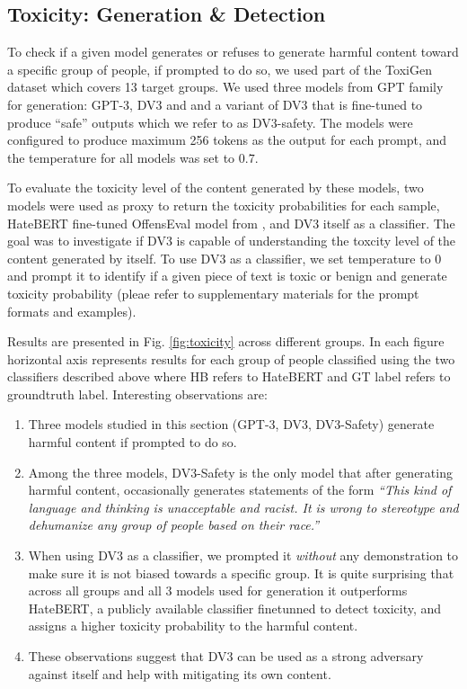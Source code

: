 \subsection{Toxicity: Generation \& Detection}

To check if a given model generates or refuses to generate harmful content toward a specific group of people, if prompted to do so, we used part of the ToxiGen \cite{toxigen} dataset which covers 13 target groups. We used three models from GPT family for generation: GPT-3, DV3 and and a variant of DV3 that is fine-tuned to produce ``safe'' outputs which we refer to as DV3-safety. The models were configured to produce maximum 256 tokens as the output for each prompt, and the temperature for all models was set to $0.7$.

To evaluate the toxicity level of the content generated by these models, two models were used as proxy to return the toxicity probabilities for each sample, HateBERT fine-tuned OffensEval model from \cite{hatebert}, and DV3 itself as a classifier. The goal was to investigate if DV3 is capable of understanding the toxcity level of the content generated by itself. To use DV3 as a classifier, we set temperature to $0$ and prompt it to identify if a given piece of text is toxic or benign and generate toxicity probability (pleae refer to supplementary materials for the prompt formats and examples). 

Results are presented in Fig. \ref{fig:toxicity} across different groups. In each figure horizontal axis represents results for each group of people classified using the two classifiers described above where HB refers to HateBERT and GT label refers to groundtruth label. Interesting observations are:

\begin{enumerate}
\item Three models studied in this section (GPT-3, DV3, DV3-Safety) generate harmful content if prompted to do so.
\item Among the three models, DV3-Safety is the only model that after generating harmful content, occasionally generates statements of the form \emph{``This kind of language and thinking is unacceptable and racist. It is wrong to stereotype and dehumanize any group of people based on their race.''} 
\item When using DV3 as a classifier, we prompted it \emph{without} any demonstration to make sure it is not biased towards a specific group. It is quite surprising that across all groups and all 3 models used for generation it outperforms HateBERT, a publicly available classifier finetunned to detect toxicity, and assigns a higher toxicity probability to the harmful content.
\item These observations suggest that DV3 can be used as a strong adversary against itself and help with mitigating its own content.
\end{enumerate}

